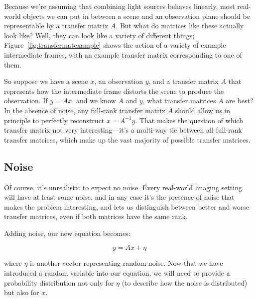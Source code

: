 
Because we're assuming that combining light sources behaves linearly, most real-world objects we can put in between a scene and an observation plane should be representable by a transfer matrix $A$. But what do matrices like these actually look like? Well, they can look like a variety of different things; Figure~\ref{fig:transfermatexample} shows the action of a variety of example intermediate frames, with an example transfer matrix corresponding to one of them.

So suppose we have a scene $x$, an observation $y$, and a transfer matrix $A$ that represents how the intermediate frame distorts the scene to produce the observation. If $y = Ax$, and we know $A$ and $y$, what transfer matrices $A$ are best? In the absence of noise, any full-rank transfer matrix $A$ should allow us in principle to perfectly reconstruct $x = A^{-1}y$. That makes the question of which transfer matrix not very interesting---it's a multi-way tie between all full-rank transfer matrices, which make up the vast majority of possible transfer matrices.

\subsection{Noise}

Of course, it's unrealistic to expect no noise. Every real-world imaging setting will have at least some noise, and in any case it's the presence of noise that makes the problem interesting, and lets us distinguish between better and worse transfer matrices, even if both matrices have the same rank.

Adding noise, our new equation becomes:

$$y = Ax + \eta$$

where $\eta$ is another vector representing random noise. Now that we have introduced a random variable into our equation, we will need to provide a probability distribution not only for $\eta$ (to describe how the noise is distributed) but also for $x$.

